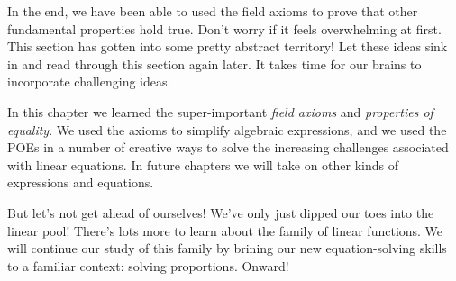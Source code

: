 In the end, we have been able to used the field axioms to prove that other fundamental properties hold true. Don't worry if it feels overwhelming at first. This section has gotten into some pretty abstract territory! Let these ideas sink in and read through this section again later. It takes time for our brains to incorporate challenging ideas.

\chaptersummary

In this chapter we learned the super-important \textit{field axioms} and \textit{properties of equality}. We used the axioms to simplify algebraic expressions, and we used the POEs in a number of creative ways to solve the increasing challenges associated with linear equations. In future chapters we will take on other kinds of expressions and equations.

But let's not get ahead of ourselves! We've only just dipped our toes into the linear pool! There's lots more to learn about the family of linear functions. We will continue our study of this family by brining our new equation-solving skills to a familiar context: solving proportions. Onward!

\chaptercopyright
